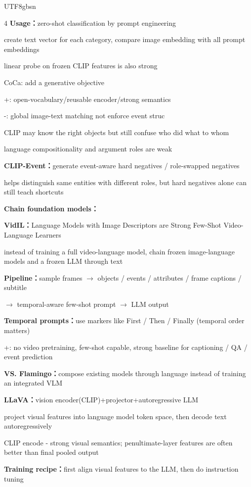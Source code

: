 \documentclass[8pt,a4paper]{extarticle}
\newcommand{\entry}[1]{\vspace{3pt}\noindent\textbf{#1：}}
\begin{document}
\begin{CJK*}{UTF8}{gbsn}
\begin{multicols*}{4}
\entry{Usage}zero-shot classification by prompt engineering

create text vector for each category, compare image embedding with all prompt embeddings

linear probe on frozen CLIP features is also strong

CoCa: add a generative objective

+: open-vocabulary/reusable encoder/strong semantics

-: global image-text matching not enforce event struc

CLIP may know the right objects but still confuse who did what to whom

language compositionality and argument roles are weak

\entry{CLIP-Event}generate event-aware hard negatives / role-swapped negatives

helps distinguish same entities with different roles, but hard negatives alone can still teach shortcuts

\entry{Chain foundation models}

\entry{VidIL}Language Models with Image Descriptors are Strong Few-Shot Video-Language Learners

instead of training a full video-language model, chain frozen image-language models and a frozen LLM through text

\entry{Pipeline}sample frames $\rightarrow$ objects / events / attributes / frame captions / subtitle

$\rightarrow$ temporal-aware few-shot prompt $\rightarrow$ LLM output

\entry{Temporal prompts}use markers like First / Then / Finally (temporal order matters)

+: no video pretraining, few-shot capable, strong baseline for captioning / QA / event prediction

\entry{VS. Flamingo}compose existing models through language instead of training an integrated VLM

\entry{LLaVA}vision encoder(CLIP)+projector+autoregressive LLM

project visual features into language model token space, then decode text autoregressively

CLIP encode - strong visual semantics; penultimate-layer features are often better than final pooled output

\entry{Training recipe}first align visual features to the LLM, then do instruction tuning


\end{multicols*}
\end{CJK*}
\end{document}
